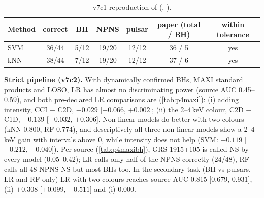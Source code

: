 \begin{table}[htbp]
\centering\small
\caption[de Beurs reproduction]{v7c1 reproduction of \citet{deBeurs2022} (,
).}
\label{tab:p4repro}
\begin{tabular}{@{}lcccccc@{}}
\toprule
Method & correct & BH & NPNS & pulsar & paper (total / BH) & within tolerance \\
\midrule
SVM & 36/44 & 5/12 & 19/20 & 12/12 & 36 / 5 & yes \\
kNN & 38/44 & 7/12 & 19/20 & 12/12 & 37 / 6 & yes \\
\bottomrule
\end{tabular}
\end{table}

\Primary{} \textbf{Strict pipeline (v7c2).} With dynamically confirmed BHs, MAXI standard products and LOSO, LR has almost no
discriminating power (source AUC 0.45--0.59), and both pre-declared LR comparisons are \NotDetected{} (\cref{tab:p4maxi}):
(i) adding intensity, CCI $-$ C2D, $-0.029$ [$-0.066$, $+0.002$]; (ii) the 2--4\,keV colour, C2D $-$ C1D, $+0.139$
[$-0.032$, $+0.306$]. Non-linear models do better with two colours (kNN 0.800, RF 0.774), and descriptively all three
non-linear models show a 2--4\,keV gain with intervals above 0, while intensity does not help (SVM: $-0.119$ [$-0.212$,
$-0.040$]). Per source (\cref{tab:p4maxibh}), GRS 1915+105 is called NS by every model (0.05--0.42); LR calls only half of the
NPNS correctly (24/48), RF calls all 48 NPNS NS but most BHs too. In the secondary task (BH vs pulsars, LR and RF only) LR with two
colours reaches source AUC 0.815 [0.679, 0.931], (ii) $+0.308$ [$+0.099$, $+0.511$] and (i) 0.000.

